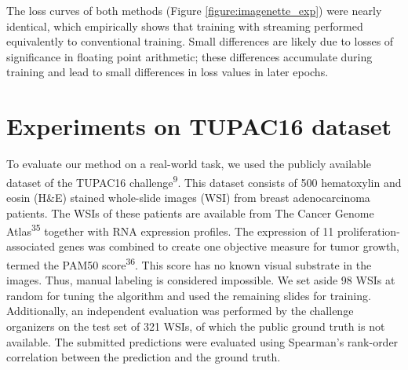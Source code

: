 \documentclass[
  12pt,
  a5,margin=2cmpaper,
]{article}
\begin{document}
The loss curves of both methods (Figure
\protect\hyperlink{figure:imagenette_exp}{{[}figure:imagenette\_exp{]}})
were nearly identical, which empirically shows that training with
streaming performed equivalently to conventional training. Small
differences are likely due to losses of significance in floating point
arithmetic; these differences accumulate during training and lead to
small differences in loss values in later epochs.

\hypertarget{section:tupac}{%
\section{Experiments on TUPAC16 dataset}\label{section:tupac}}

To evaluate our method on a real-world task, we used the publicly
available dataset of the TUPAC16 challenge\textsuperscript{9}. This
dataset consists of 500 hematoxylin and eosin (H\&E) stained whole-slide
images (WSI) from breast adenocarcinoma patients. The WSIs of these
patients are available from The Cancer Genome Atlas\textsuperscript{35}
together with RNA expression profiles. The expression of 11
proliferation-associated genes was combined to create one objective
measure for tumor growth, termed the PAM50 score\textsuperscript{36}.
This score has no known visual substrate in the images. Thus, manual
labeling is considered impossible. We set aside 98 WSIs at random for
tuning the algorithm and used the remaining slides for training.
Additionally, an independent evaluation was performed by the challenge
organizers on the test set of 321 WSIs, of which the public ground truth
is not available. The submitted predictions were evaluated using
Spearman's rank-order correlation between the prediction and the ground
truth.
\end{document}
